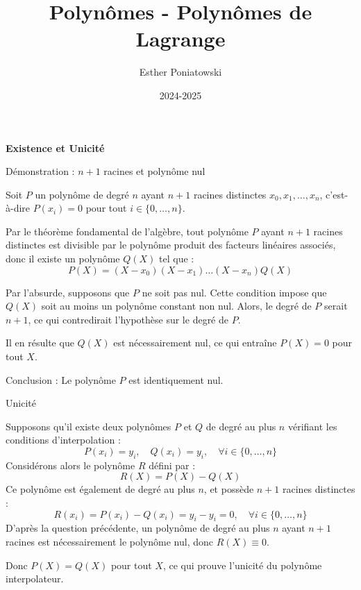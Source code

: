 \documentclass[10pt,a4paper]{article}
\title{Polynômes - Polynômes de Lagrange}
\author{Esther Poniatowski}
\date{2024-2025}
\begin{document}
\bigskip
\textbf{Existence et Unicité}


\q Démonstration : \( n+1 \) racines et polynôme nul

Soit \( P \) un polynôme de degré \( n \) ayant \( n+1 \) racines distinctes \( x_0, x_1, \dots, x_n
\), c'est-à-dire $ P(x_i) = 0 $ pour tout \( i \in \{0, \dots, n\} \).

Par le théorème fondamental de l'algèbre, tout polynôme \( P \) ayant \( n+1 \) racines distinctes
est divisible par le polynôme produit des facteurs linéaires associés, donc il existe un polynôme \(
Q(X) \) tel que :
\[
P(X) = (X - x_0)(X - x_1) \dots (X - x_n) Q(X)
\]

Par l'absurde, supposons que $P$ ne soit pas nul. Cette condition impose que \( Q(X) \) soit au
moins un polynôme constant non nul. Alors, le degré de \( P \) serait \( n+1 \), ce qui contredirait
l'hypothèse sur le degré de \( P \).

Il en résulte que \( Q(X) \) est nécessairement nul, ce qui entraîne $ P(X) = 0 $ pour tout \( X \).

Conclusion : Le polynôme \( P \) est identiquement nul.

\q Unicité

Supposons qu'il existe deux polynômes \( P \) et \( Q \) de degré au plus \( n \) vérifiant les
conditions d'interpolation :
\[
P(x_i) = y_i, \quad Q(x_i) = y_i, \quad \forall i \in \{0, \dots, n\}
\]
Considérons alors le polynôme \( R \) défini par :
\[
R(X) = P(X) - Q(X)
\]
Ce polynôme est également de degré au plus \( n \), et possède \( n+1 \) racines distinctes :
\[
R(x_i) = P(x_i) - Q(x_i) = y_i - y_i = 0, \quad \forall i \in \{0, \dots, n\}
\]
D'après la question précédente, un polynôme de degré au plus \( n \) ayant \( n+1 \) racines est
nécessairement le polynôme nul, donc $ R(X) \equiv 0 $.

Donc \( P(X) = Q(X) \) pour tout \( X \), ce qui prouve l'unicité du polynôme interpolateur.
\end{document}
